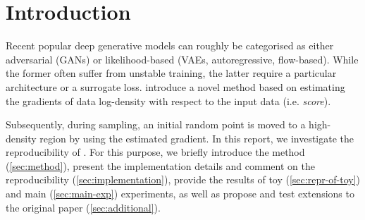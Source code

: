\section{Introduction}
Recent popular deep generative models can roughly be categorised as either adversarial (GANs) or likelihood-based (VAEs, autoregressive, flow-based). While the former often suffer from unstable training, the latter require a particular architecture or a surrogate loss.
\citet{ncsn-paper} introduce a novel method based on estimating the gradients of data log-density with respect to the input data (i.e. \textit{score}).

Subsequently, during sampling, an initial random point is moved to a high-density region by using the estimated gradient. In this report, we investigate the reproducibility of %
\cite{ncsn-paper}. For this purpose, we briefly introduce the method (\autoref{sec:method}), present the implementation details and comment on the reproducibility (\autoref{sec:implementation}), provide the results of toy (\autoref{sec:repr-of-toy}) and main (\autoref{sec:main-exp}) experiments, as well as propose and test extensions to the original paper (\autoref{sec:additional}).
